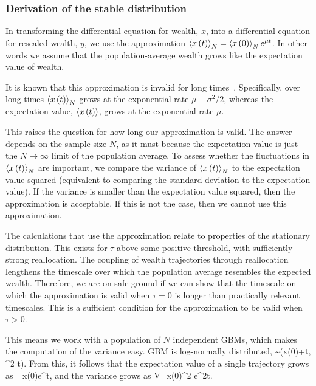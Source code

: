 \subsubsection{Derivation of the stable distribution}

In transforming the differential equation for wealth, $x$, into a differential equation for rescaled wealth, $y$, we use the approximation $\left\langle x\left(t\right) \right\rangle_N=\left\langle x\left(0\right) \right\rangle_N e^{\mu t}$. In other words we assume that the population-average wealth grows like the expectation value of wealth. 

It is known that this approximation is invalid for long times~\cite{PetersKlein2013}. Specifically, over long times $\left\langle x\left(t\right) \right\rangle_N$ grows at the exponential rate $\mu-\sigma^2/2$, whereas the expectation value, $\left\langle x\left(t\right) \right\rangle$, grows at the exponential rate $\mu$.

This raises the question for how long our approximation is valid. 
The answer depends on the sample size $N$, as it must because the expectation value is just the $N\to\infty$ limit of the population average.
To assess whether the fluctuations in $\left\langle x\left(t\right) \right\rangle_N$ are important, we compare the variance of $\left\langle x\left(t\right) \right\rangle_N$ to the expectation value squared (equivalent to comparing the standard deviation to the expectation value). 
If the variance is smaller than the expectation value squared, then the approximation is acceptable. 
If this is not the case, then we cannot use this approximation.

The calculations that use the approximation relate to properties of the stationary distribution. This exists for $\tau$ above some positive threshold, \ie with sufficiently strong reallocation. The coupling of wealth trajectories through reallocation lengthens the timescale over which the population average resembles the expected wealth. Therefore, we are on safe ground if we can show that the timescale on which the approximation is valid when $\tau=0$ is longer than practically relevant timescales. This is a sufficient condition for the approximation to be valid when $\tau>0$.

This means we work with a population of $N$ independent GBMs, which makes the computation of the variance easy. GBM is log-normally distributed,
\be
\ln{}\sim \ln{}\ln\left(x\left(0\right)+ t, \sigma^2 t\right).
\ee
From this, it follows that the expectation value of a single trajectory grows as
\be
{}=x\left(0\right)e^{\mu t},
\ee
and the variance grows as
\be
V=x\left(0\right)^2 e^{2\mu t}.
\ee

